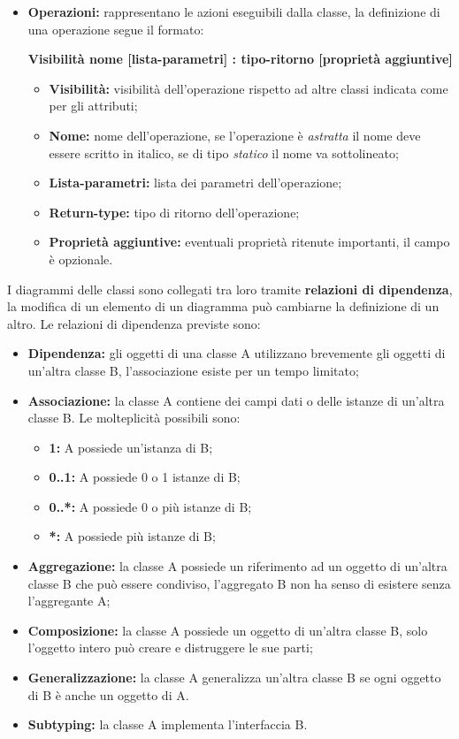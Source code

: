 \begin{itemize}
\begin{itemize}
	\end{itemize}
	\item \textbf{Operazioni:} rappresentano le azioni eseguibili dalla classe, la definizione di una operazione segue il formato:
	\begin{center}
		\textbf{Visibilità nome [lista-parametri] : tipo-ritorno [proprietà aggiuntive]}
	\end{center}
	\begin{itemize}
		\item \textbf{Visibilità:} visibilità dell'operazione rispetto ad altre classi indicata come per gli attributi;
		\item \textbf{Nome:} nome dell'operazione, se l'operazione è \textit{astratta} il nome deve essere scritto in italico, se di tipo \textit{statico} il nome va sottolineato;
		\item \textbf{Lista-parametri:} lista dei parametri dell'operazione; 
		\item \textbf{Return-type:} tipo di ritorno dell'operazione;
		\item \textbf{Proprietà aggiuntive:} eventuali proprietà ritenute importanti, il campo è opzionale.
	\end{itemize}
\end{itemize}
I diagrammi delle classi sono collegati tra loro tramite \textbf{relazioni di dipendenza}, la modifica di un elemento di un diagramma può cambiarne la definizione di un altro.
Le relazioni di dipendenza previste sono:
	\begin{itemize}
		\item \textbf{Dipendenza:} gli oggetti di una classe A utilizzano brevemente gli oggetti di un'altra classe B, l'associazione esiste per un tempo limitato;
		\item \textbf{Associazione:} la classe A contiene dei campi dati o delle istanze di un'altra classe B. Le molteplicità possibili sono:
		\begin{itemize}
			\item \textbf{1:} A possiede un'istanza di B;
			\item \textbf{0..1:} A possiede 0 o 1 istanze di B;
			\item \textbf{0..*:} A possiede 0 o più istanze di B;
			\item \textbf{*:} A possiede più istanze di B;
		\end{itemize}
		\item \textbf{Aggregazione:} la classe A possiede un riferimento ad un oggetto di un'altra classe B che può essere condiviso, l'aggregato B non ha senso di esistere senza l'aggregante A;
		\item \textbf{Composizione:} la classe A possiede un oggetto di un'altra classe B, solo l'oggetto intero può creare e distruggere le sue parti;
		\item \textbf{Generalizzazione:} la classe A generalizza un'altra classe B se ogni oggetto di B è anche un oggetto di A.
		\item \textbf{Subtyping:}  la classe A implementa l'interfaccia B.
	\end{itemize}

